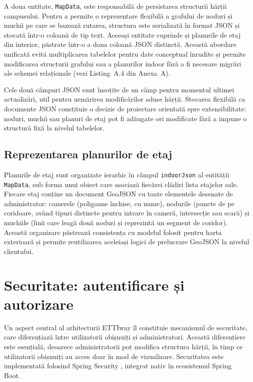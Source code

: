 A doua entitate, \texttt{MapData}, este responsabilă de persistarea structurii
hărții campusului. Pentru a permite o reprezentare flexibilă a grafului de
noduri și muchii pe care se bazează rutarea, structura este serializată în
format JSON și stocată într-o coloană de tip text. Aceeași entitate cuprinde
și planurile de etaj din interior, păstrate într-o a doua coloană JSON
distinctă. Această abordare unificată evită multiplicarea tabelelor pentru
date conceptual înrudite și permite modificarea structurii grafului sau a
planurilor indoor fără a fi necesare migrări ale schemei relaționale (vezi
Listing~A.4 din Anexa~A).

Cele două câmpuri JSON sunt însoțite de un câmp pentru momentul ultimei
actualizări, util pentru urmărirea modificărilor aduse hărții. Stocarea
flexibilă ca documente JSON constituie o decizie de proiectare orientată spre
extensibilitate: noduri, muchii sau planuri de etaj pot fi adăugate ori
modificate fără a impune o structură fixă la nivelul tabelelor.

\subsection{Reprezentarea planurilor de etaj}
\label{subsec:indoor-storage}

Planurile de etaj sunt organizate ierarhic în câmpul \texttt{indoorJson} al
entității \texttt{MapData}, sub forma unui obiect care asociază fiecărei
clădiri lista etajelor sale. Fiecare etaj conține un document GeoJSON cu
toate elementele desenate de administrator: camerele (poligoane închise, cu
nume), nodurile (puncte de pe coridoare, având tipuri distincte pentru
intrare în cameră, intersecție sau scară) și muchiile (linii care leagă două
noduri și reprezintă un segment de coridor). Această organizare păstrează
consistența cu modelul folosit pentru harta exterioară și permite reutilizarea
aceleiași logici de prelucrare GeoJSON la nivelul clientului.

\section{Securitate: autentificare și autorizare}
\label{sec:securitate}

Un aspect central al arhitecturii ETTIway îl constituie mecanismul de
securitate, care diferențiază între utilizatorii obișnuiți și administratori.
Această diferențiere este esențială, deoarece administratorii pot modifica
structura hărții, în timp ce utilizatorii obișnuiți au acces doar în mod de
vizualizare. Securitatea este implementată folosind Spring Security
\cite{SpringSecurity}, integrat nativ în ecosistemul Spring Boot.

